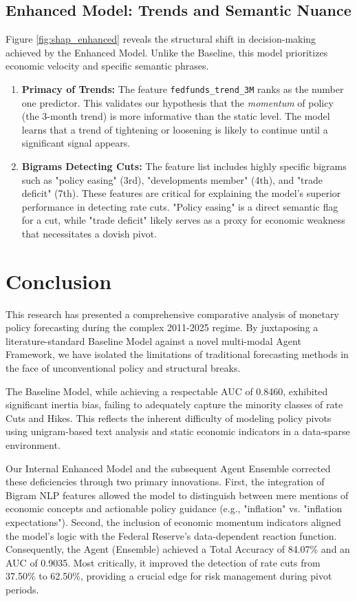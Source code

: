 \documentclass[11pt, a4paper]{article}
\begin{document}
\subsection{Enhanced Model: Trends and Semantic Nuance}
Figure \ref{fig:shap_enhanced} reveals the structural shift in decision-making achieved by the Enhanced Model. Unlike the Baseline, this model prioritizes economic velocity and specific semantic phrases.
\begin{enumerate}
    \item \textbf{Primacy of Trends:} The feature \texttt{fedfunds\_trend\_3M} ranks as the number one predictor. This validates our hypothesis that the \textit{momentum} of policy (the 3-month trend) is more informative than the static level. The model learns that a trend of tightening or loosening is likely to continue until a significant signal appears.
    \item \textbf{Bigrams Detecting Cuts:} The feature list includes highly specific bigrams such as "policy easing" (3rd), "developments member" (4th), and "trade deficit" (7th). These features are critical for explaining the model's superior performance in detecting rate cuts. "Policy easing" is a direct semantic flag for a cut, while "trade deficit" likely serves as a proxy for economic weakness that necessitates a dovish pivot.
\end{enumerate}

\section{Conclusion}
This research has presented a comprehensive comparative analysis of monetary policy forecasting during the complex 2011-2025 regime. By juxtaposing a literature-standard Baseline Model against a novel multi-modal Agent Framework, we have isolated the limitations of traditional forecasting methods in the face of unconventional policy and structural breaks.

The Baseline Model, while achieving a respectable AUC of 0.8460, exhibited significant inertia bias, failing to adequately capture the minority classes of rate Cuts and Hikes. This reflects the inherent difficulty of modeling policy pivots using unigram-based text analysis and static economic indicators in a data-sparse environment.

Our Internal Enhanced Model and the subsequent Agent Ensemble corrected these deficiencies through two primary innovations. First, the integration of Bigram NLP features allowed the model to distinguish between mere mentions of economic concepts and actionable policy guidance (e.g., "inflation" vs. "inflation expectations"). Second, the inclusion of economic momentum indicators aligned the model's logic with the Federal Reserve's data-dependent reaction function. Consequently, the Agent (Ensemble) achieved a Total Accuracy of 84.07\% and an AUC of 0.9035. Most critically, it improved the detection of rate cuts from 37.50\% to 62.50\%, providing a crucial edge for risk management during pivot periods.
\end{document}
